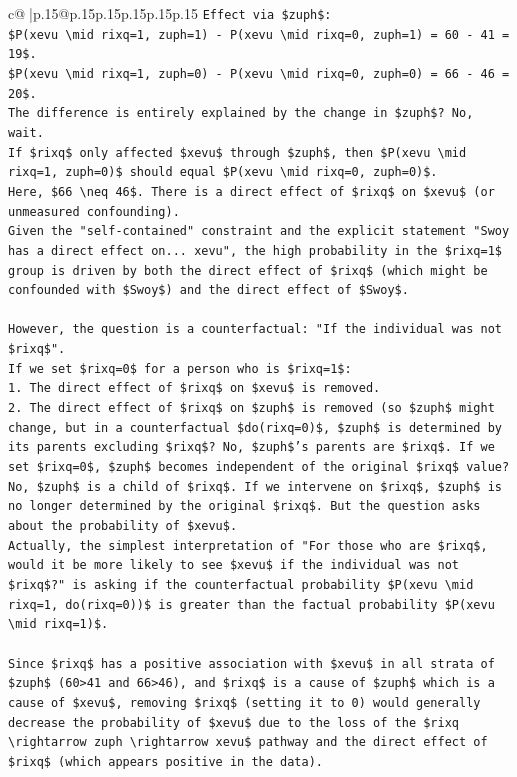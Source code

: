 \documentclass{article}
\begin{document}
{\begin{supertabular}{c@{$\;$}|p{.15\linewidth}@{}p{.15\linewidth}p{.15\linewidth}p{.15\linewidth}p{.15\linewidth}p{.15\linewidth}}
{{{\texttt{Effect via \$zuph\$:} \\
\texttt{\$P(xevu \textbackslash{}mid rixq=1, zuph=1) {-} P(xevu \textbackslash{}mid rixq=0, zuph=1) = 60 {-} 41 = 19\$.} \\
\texttt{\$P(xevu \textbackslash{}mid rixq=1, zuph=0) {-} P(xevu \textbackslash{}mid rixq=0, zuph=0) = 66 {-} 46 = 20\$.} \\
\texttt{The difference is entirely explained by the change in \$zuph\$? No, wait.} \\
\texttt{If \$rixq\$ only affected \$xevu\$ through \$zuph\$, then \$P(xevu \textbackslash{}mid rixq=1, zuph=0)\$ should equal \$P(xevu \textbackslash{}mid rixq=0, zuph=0)\$.} \\
\texttt{Here, \$66 \textbackslash{}neq 46\$. There is a direct effect of \$rixq\$ on \$xevu\$ (or unmeasured confounding).} \\
\texttt{Given the "self{-}contained" constraint and the explicit statement "Swoy has a direct effect on... xevu", the high probability in the \$rixq=1\$ group is driven by both the direct effect of \$rixq\$ (which might be confounded with \$Swoy\$) and the direct effect of \$Swoy\$.} \\
\\ 
\texttt{However, the question is a counterfactual: "If the individual was not \$rixq\$".} \\
\texttt{If we set \$rixq=0\$ for a person who is \$rixq=1\$:} \\
\texttt{1.  The direct effect of \$rixq\$ on \$xevu\$ is removed.} \\
\texttt{2.  The direct effect of \$rixq\$ on \$zuph\$ is removed (so \$zuph\$ might change, but in a counterfactual \$do(rixq=0)\$, \$zuph\$ is determined by its parents excluding \$rixq\$? No, \$zuph\$'s parents are \$rixq\$. If we set \$rixq=0\$, \$zuph\$ becomes independent of the original \$rixq\$ value? No, \$zuph\$ is a child of \$rixq\$. If we intervene on \$rixq\$, \$zuph\$ is no longer determined by the original \$rixq\$. But the question asks about the probability of \$xevu\$.} \\
\texttt{Actually, the simplest interpretation of "For those who are \$rixq\$, would it be more likely to see \$xevu\$ if the individual was not \$rixq\$?" is asking if the counterfactual probability \$P(xevu \textbackslash{}mid rixq=1, do(rixq=0))\$ is greater than the factual probability \$P(xevu \textbackslash{}mid rixq=1)\$.} \\
\\ 
\texttt{Since \$rixq\$ has a positive association with \$xevu\$ in all strata of \$zuph\$ (60>41 and 66>46), and \$rixq\$ is a cause of \$zuph\$ which is a cause of \$xevu\$, removing \$rixq\$ (setting it to 0) would generally decrease the probability of \$xevu\$ due to the loss of the \$rixq \textbackslash{}rightarrow zuph \textbackslash{}rightarrow xevu\$ pathway and the direct effect of \$rixq\$ (which appears positive in the data).} \\
}}}
\end{supertabular}}
\end{document}
